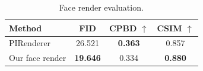 
\begin{table}[h]
\centering
\begin{tabular}{lccc}
\toprule
Method & FID  & CPBD $\uparrow$ & CSIM $\uparrow$  \\ \hline
PIRenderer~\cite{ren2021pirenderer} &26.521 &\textbf{0.363} & 0.857\\ \hline
Our face render & \textbf{19.646} & 0.334 & \textbf{0.880}  \\ 
\bottomrule
\end{tabular}
\caption{Face render evaluation.}
\label{tab:pirender}
\end{table}